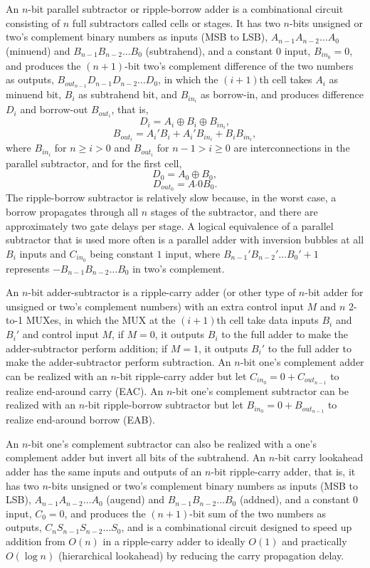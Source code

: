 \documentclass[a4paper,12pt]{article}
\begin{document}
\begin{itemize}
\begin{itemize}
\begin{itemize}
\begin{itemize}
\begin{itemize}
\begin{itemize}
\begin{itemize}
An $n$-bit parallel subtractor or ripple-borrow adder is a combinational circuit consisting of $n$ full subtractors called cells or stages. It has two $n$-bits unsigned or two's complement binary numbers as inputs (MSB to LSB), $A_{n-1}A_{n-2}\ldots A_0$ (minuend) and $B_{n-1}B_{n-2}\ldots B_0$ (subtrahend), and a constant $0$ input, $B_{in_0}=0$, and produces the $(n+1)$-bit two's complement difference of the two numbers as outputs, $B_{out_{n-1}}D_{n-1}D_{n-2}\ldots D_0$, in which the $(i+1)$th cell takes $A_i$ as minuend bit, $B_i$ as subtrahend bit, and $B_{in_i}$ as borrow-in, and produces difference $D_i$ and borrow-out $B_{out_i}$, that is,
\[D_i=A_i\oplus B_i\oplus B_{in_i},\]
\[B_{out_i}=A_i'B_i+A_i'B_{in_i}+B_iB_{in_i},\]
where $B_{in_i}$ for $n\geq i>0$ and $B_{out_i}$ for $n-1>i\geq 0$ are interconnections in the parallel subtractor, and for the first cell,
\[D_0=A_0\oplus B_0,\]
\[D_{out_0}=A_'0B_0.\]
The ripple-borrow subtractor is relatively slow because, in the worst case, a borrow propagates through all $n$ stages of the subtractor, and there are approximately two gate delays per stage.
A logical equivalence of a parallel subtractor that is used more often is a parallel adder with inversion bubbles at all $B_i$ inputs and $C_{in_0}$ being constant $1$ input, where $B_{n-1}'B_{n-2}'\ldots B_0'+1$ represents $-B_{n-1}B_{n-2}\ldots B_0$ in two's complement.

An $n$-bit adder-subtractor is a ripple-carry adder (or other type of $n$-bit adder for unsigned or two's complement numbers) with an extra control input $M$ and $n$ 2-to-1 MUXes, in which the MUX at the $(i+1)$th cell take data inputs $B_i$ and $B_i'$ and control input $M$, if $M=0$, it outputs $B_i$ to the full adder to make the adder-subtractor perform addition; if $M=1$, it outputs $B_i'$ to the full adder to make the adder-subtractor perform subtraction.
An $n$-bit one's complement adder can be realized with an $n$-bit ripple-carry adder but let $C_{in_0}=0+C_{out_{n-1}}$ to realize end-around carry (EAC).
An $n$-bit one's complement subtractor can be realized with an $n$-bit ripple-borrow subtractor but let $B_{in_0}=0+B_{out_{n-1}}$ to realize end-around borrow (EAB).

An $n$-bit one's complement subtractor can also be realized with a one's complement adder but invert all bits of the subtrahend.
An $n$-bit carry lookahead adder has the same inputs and outputs of an $n$-bit ripple-carry adder, that is, it has two $n$-bits unsigned or two's complement binary numbers as inputs (MSB to LSB), $A_{n-1}A_{n-2}\ldots A_0$ (augend) and $B_{n-1}B_{n-2}\ldots B_0$ (addned), and a constant $0$ input, $C_0=0$, and produces the $(n+1)$-bit sum of the two numbers as outputs, $C_nS_{n-1}S_{n-2}\ldots S_0$, and is a combinational circuit designed to speed up addition from $O(n)$ in a ripple-carry adder
to ideally $O(1)$ and practically $O(\log n)$ (hierarchical lookahead) by reducing the carry propagation delay.


\end{itemize}
\end{itemize}
\end{itemize}
\end{itemize}
\end{itemize}
\end{itemize}
\end{itemize}
\end{document}
